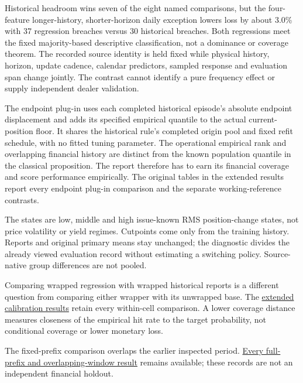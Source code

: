 \documentclass[10pt,a4paper]{article}
\begin{document}
Historical headroom wins seven of the eight named comparisons, but the
four-feature longer-history, shorter-horizon daily exception lowers loss by
about 3.0\% with 37 regression breaches versus 30 historical breaches.
Both regressions meet the fixed majority-based descriptive classification,
not a dominance or coverage theorem. The recorded source identity is held fixed while physical history, horizon, update cadence, calendar predictors, sampled response and evaluation span change jointly. The contrast cannot
identify a pure frequency effect or supply independent dealer validation.

The endpoint plug-in uses each completed historical episode's
absolute endpoint displacement and adds its specified empirical quantile to
the actual current-position floor. It shares the historical rule's completed
origin pool and fixed refit schedule, with no fitted tuning parameter.
The operational empirical rank and overlapping financial history are distinct
from the known population quantile in the classical proposition. The report
therefore has to earn its financial coverage and score performance empirically.
The original tables in the extended results report every endpoint plug-in comparison and the separate working-reference contrasts.

The states are low, middle and high issue-known RMS position-change
states, not price volatility or yield regimes. Cutpoints come only from the
training history. Reports and original primary means stay unchanged; the
diagnostic divides the already viewed evaluation record without estimating a
switching policy. Source-native group differences are not pooled.

Comparing wrapped regression with wrapped historical reports is a
different question from comparing either wrapper with its unwrapped base.
The \href{https://github.com/ByronLi0207/financial-mathematics-paper-20261020/blob/submission-final/EXTENDED_RESULTS.md#asmbi-extended-s17}{extended calibration results} retain every within-cell comparison. A lower coverage distance measures closeness of the empirical hit rate to the target probability, not conditional coverage or lower monetary loss.

The fixed-prefix comparison overlaps the earlier inspected period. \href{https://github.com/ByronLi0207/financial-mathematics-paper-20261020/blob/submission-final/EXTENDED_RESULTS.md#asmbi-extended-s26}{Every full-prefix and overlapping-window result} remains available; these records are not an independent financial holdout.
\end{document}
